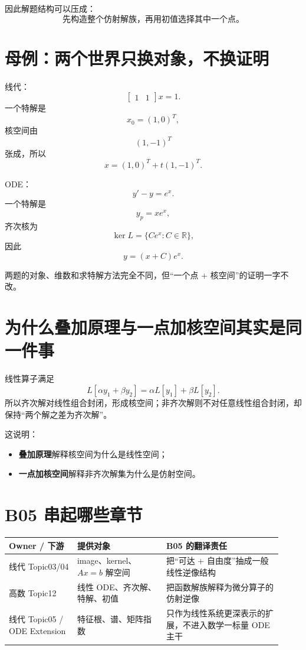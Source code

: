 \documentclass[profile=standard]{ipara-handbook}
\begin{document}
因此解题结构可以压成：
\[
\boxed{\text{先构造整个仿射解族，再用初值选择其中一个点。}}
\]

\section{母例：两个世界只换对象，不换证明}
线代：
\[
\begin{bmatrix}1&1\end{bmatrix}x=1.
\]
一个特解是
\[
x_0=(1,0)^T,
\]
核空间由
\[
(1,-1)^T
\]
张成，所以
\[
x=(1,0)^T+t(1,-1)^T.
\]

ODE：
\[
y'-y=e^x.
\]
一个特解是
\[
y_p=xe^x,
\]
齐次核为
\[
\ker L=\{Ce^x:C\in\mathbb R\},
\]
因此
\[
y=(x+C)e^x.
\]

两题的对象、维数和求特解方法完全不同，但“一个点 + 核空间”的证明一字不改。

\section{为什么叠加原理与一点加核空间其实是同一件事}
线性算子满足
\[
L[\alpha y_1+\beta y_2]
=\alpha L[y_1]+\beta L[y_2].
\]
所以齐次解对线性组合封闭，形成核空间；非齐次解则不对任意线性组合封闭，却保持“两个解之差为齐次解”。

这说明：
\begin{itemize}
\item \textbf{叠加原理}解释核空间为什么是线性空间；
\item \textbf{一点加核空间}解释非齐次解集为什么是仿射空间。
\end{itemize}

\section{B05 串起哪些章节}
\begin{tabular}{p{0.23\linewidth}p{0.30\linewidth}p{0.39\linewidth}}
\hline
Owner / 下游 & 提供对象 & B05 的翻译责任\\
\hline
线代 Topic03/04 & image、kernel、$Ax=b$ 解空间 & 把“可达 + 自由度”抽成一般线性逆像结构\\
高数 Topic12 & 线性 ODE、齐次解、特解、初值 & 把函数解族解释为微分算子的仿射逆像\\
线代 Topic05 / ODE Extension & 特征根、谱、矩阵指数 & 只作为线性系统更深表示的扩展，不进入数学一标量 ODE 主干\\
\hline
\end{tabular}
\end{document}
